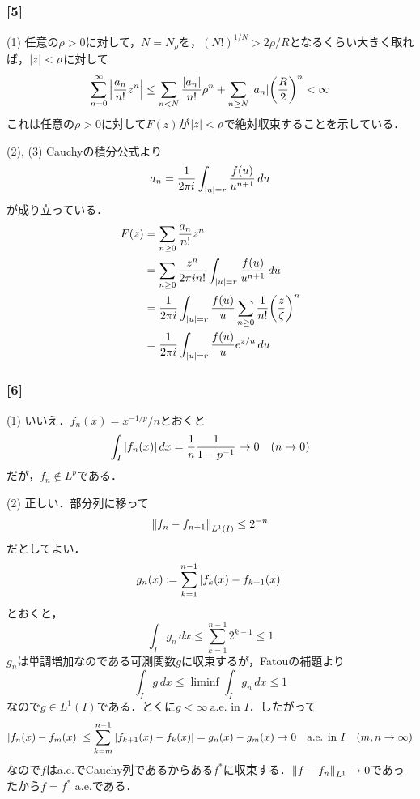 \documentclass[a4j]{ltjsarticle}
\newcommand{\1}{\mathbbm{1}}
\numberwithin{equation}{section}
\theoremstyle{definition}
\begin{document}
\subsubsection*{[5]}
(1) 任意の$\rho>0$に対して，$N=N_{\rho}$を，$(N!)^{1/N}>2\rho/R$となるくらい大きく取れば，$\abs{z}<\rho$に対して
\begin{equation}
    \sum_{n=0}^\infty \abs{\frac{a_n}{n!}z^n}\leq \sum_{n< N}\frac{\abs{a_n}}{n!}\rho^n+\sum_{n\geq N}\abs{a_n}\qty(\frac{R}{2})^n<\infty 
\end{equation}
これは任意の$\rho>0$に対して$F(z)$が$\abs{z}<\rho$で絶対収束することを示している．

(2), (3) Cauchyの積分公式より
\begin{equation}
    a_n=\frac{1}{2\pi i}\int_{\abs{u}=r}\frac{f(u)}{u^{n+1}}\,du 
\end{equation}
が成り立っている．
\begin{align}
    F(z)&=\sum_{n\geq0}\frac{a_n}{n!}z^n\\
    &=\sum_{n\geq0}\frac{z^n}{2\pi i n!}\int_{\abs{u}=r}\frac{f(u)}{u^{n+1}}\,du\\
    &=\frac{1}{2\pi i}\int_{\abs{u}=r}\frac{f(u)}{u}\sum_{n\geq0}\frac{1}{n!}\qty(\frac{z}{\zeta})^n\\
    &=\frac{1}{2\pi i}\int_{\abs{u}=r}\frac{f(u)}{u}e^{z/u}\,du 
\end{align}
\subsubsection*{[6]}
(1) いいえ．$f_n(x)=x^{-1/p}/n$とおくと
\begin{equation}
    \int_{I}\abs{f_n(x)}\,dx=\frac{1}{n}\frac{1}{1-p^{-1}}\to 0\quad (n\to0) 
\end{equation}
だが，$f_n\notin L^p$である．

(2) 正しい．部分列に移って
\begin{equation}
    \norm{f_n-f_{n+1}}_{L^1(I)}\leq 2^{-n}
\end{equation}
だとしてよい．
\begin{equation}
    g_n(x)\coloneq\sum_{k=1}^{n-1}\abs{f_k(x)-f_{k+1}(x)}
\end{equation}
とおくと，
\begin{equation}
    \int_{I}g_n\,dx\leq \sum_{k=1}^{n-1}2^{k-1}\leq 1 
\end{equation}
$g_n$は単調増加なのである可測関数$g$に収束するが，Fatouの補題より
\begin{equation}
    \int_{I}g\,dx\leq \liminf\int_{I}g_n\,dx\leq 1 
\end{equation}
なので$g\in L^1(I)$である．とくに$g<\infty\ \text{a.e. in $I$}$．したがって
\begin{equation}
    \abs{f_n(x)-f_m(x)}\leq \sum_{k=m}^{n-1}\abs{f_{k+1}(x)-f_k(x)}=g_n(x)-g_m(x)\to 0 \quad \text{a.e. in $I$}\quad(m,n\to\infty)
\end{equation}
なので$f$はa.e.でCauchy列であるからある$f^\ast$に収束する．$\norm{f-f_n}_{L^1}\to0$であったから$f=f^\ast$ a.e.である．
\end{document}
